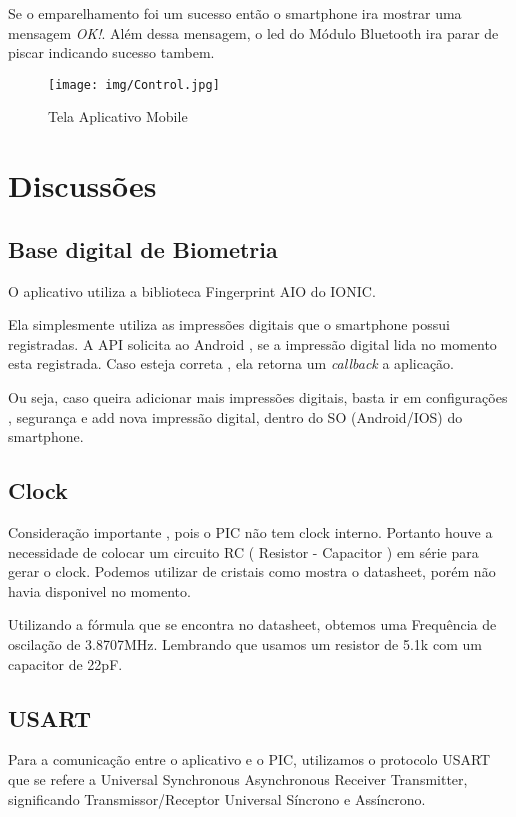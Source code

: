 \documentclass[
	article,			%
	12pt,				%
	oneside,			%
	a4paper,            %
	twocolumn,
	english,			%
	brazil,				%
	sumario=tradicional
	]{abntex2}
\begin{document}
Se o emparelhamento foi um sucesso então o smartphone ira mostrar uma mensagem \emph{OK!}. Além dessa mensagem, o led do Módulo Bluetooth ira parar de piscar indicando sucesso tambem.

\begin{figure}[!h]
    \centering
    \texttt{[image: img/Control.jpg]}
    \caption{Tela Aplicativo Mobile}
    \label{fig:appMobile}
\end{figure}

\section{Discussões}

\subsection{Base digital de Biometria}
O aplicativo utiliza a biblioteca Fingerprint AIO do IONIC. 

Ela simplesmente utiliza as impressões digitais que o smartphone possui registradas. A API solicita ao Android , se a impressão digital lida no momento esta registrada. Caso esteja correta , ela retorna um \emph{callback} a aplicação.

Ou seja, caso queira adicionar mais impressões digitais, basta ir em configurações , segurança e add nova impressão digital, dentro do SO (Android/IOS) do smartphone.

\subsection{Clock}
Consideração importante , pois o PIC não tem clock interno. Portanto houve a necessidade de colocar um circuito RC ( Resistor - Capacitor ) em série para gerar o clock. Podemos utilizar de cristais como mostra o datasheet, porém não havia disponivel no momento.

Utilizando a fórmula que se encontra no datasheet, obtemos uma Frequência de oscilação de 3.8707MHz. Lembrando que usamos um resistor de 5.1k com um capacitor de 22pF.

\subsection{USART}
\label{USART}
Para a comunicação entre o aplicativo e o PIC, utilizamos o protocolo USART que se refere a Universal Synchronous Asynchronous Receiver Transmitter, significando Transmissor/Receptor Universal Síncrono e Assíncrono. 
\end{document}

